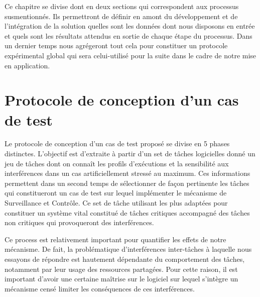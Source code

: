 \documentclass[french, a4paper, 11pt, twoside, pdftex]{StyleThese}
\begin{document}
        Ce chapitre se divise dont en deux sections qui correspondent aux processus susmentionnés. Ils permettront de définir en amont du développement et de l'intégration de la solution quelles sont les données dont nous disposons en entrée et quels sont les résultats attendus en sortie de chaque étape du processus. Dans un dernier temps nous agrégeront tout cela pour constituer un protocole expérimental global qui sera celui-utilisé pour la suite dans le cadre de notre mise en application.
        
       
        \section{Protocole de conception d'un cas de test}
        
        Le protocole de conception d'un cas de test proposé se divise en 5 phases distinctes. L'objectif est d'extraite à partir d'un set de tâches logicielles donné un jeu de tâches dont on connaît les profils d'exécutions et la sensibilité aux interférences dans un cas artificiellement stressé au maximum. Ces informations permettent dans un second temps de sélectionner de façon pertinente les tâches qui constitueront un cas de test sur lequel implémenter le mécanisme de Surveillance et Contrôle. Ce set de tâche utilisant les plus adaptées pour constituer un système vital constitué de tâches critiques accompagné des tâches non critiques qui provoqueront des interférences.
        
        Ce process est relativement important pour quantifier les effets de notre mécanisme. De fait, la problématique d'interférences inter-tâches à laquelle nous essayons de répondre est hautement dépendante du comportement des tâches, notamment par leur usage des ressources partagées. Pour cette raison, il est important d'avoir une certaine maîtrise sur le logiciel sur lequel s'intègre un mécanisme censé limiter les conséquences de ces interférences. 
        
\end{document}
